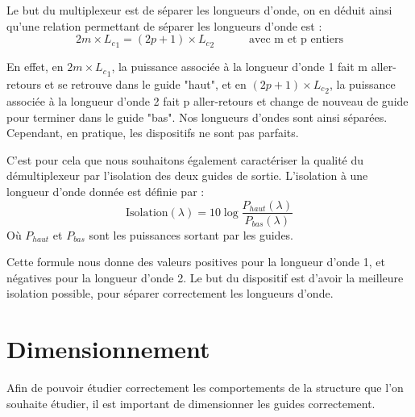 \documentclass[a4paper,11pt]{report}
\begin{document}
Le but du multiplexeur est de séparer les longueurs d'onde, on en déduit ainsi qu'une relation permettant de séparer les longueurs d'onde est :
\begin{equation}
    2m\times{L_c}_1=(2p+1)\times{L_c}_2\,\,\hspace{1cm}\text{   avec m et p entiers}
\end{equation}

En effet, en $2m\times{L_c}_1$, la puissance associée à la longueur d'onde 1 fait m aller-retours et se retrouve dans le guide "haut", et en $(2p+1)\times{L_c}_2$, la puissance associée à la longueur d'onde 2 fait p aller-retours et change de nouveau de guide pour terminer dans le guide "bas". Nos longueurs d'ondes sont ainsi séparées. Cependant, en pratique, les dispositifs ne sont pas parfaits.


%
%
C'est pour cela que nous souhaitons également caractériser la qualité du démultiplexeur par l'isolation des deux guides de sortie.
L'isolation à une longueur d'onde donnée est définie par :
\[
    \text{Isolation}(\lambda) = 10 \log\frac{P_{haut}(\lambda)}{P_{bas}(\lambda)}
\]
Où $P_{haut}$ et $P_{bas}$ sont les puissances sortant par les guides.

Cette formule nous donne des valeurs positives pour la longueur d'onde 1, et négatives pour la longueur d'onde 2. Le but du dispositif est d'avoir la meilleure isolation possible, pour séparer correctement les longueurs d'onde.

\chapter{Dimensionnement}
Afin de pouvoir étudier correctement les comportements de la structure que l'on souhaite étudier, il est important de dimensionner les guides correctement.
\end{document}

